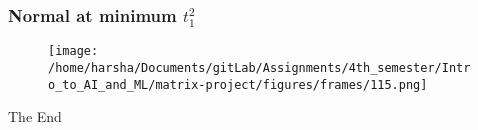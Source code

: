 \documentclass[12pt]{beamer}
\begin{document}

\begin{frame}
\frametitle{Normal at minimum $t_1^2$}
\begin{figure}
\centering
\texttt{[image: /home/harsha/Documents/gitLab/Assignments/4th\_semester/Intro\_to\_AI\_and\_ML/matrix-project/figures/frames/115.png]}
\label{Normal at minimum $t_1^2$}
\end{figure}
\end{frame}


\begin{frame}
\Huge{\centerline{The End}}
\end{frame}

\end{document}
